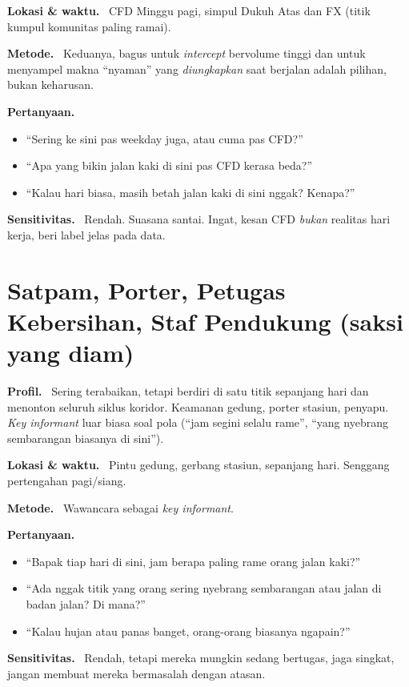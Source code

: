 \documentclass[11pt,a4paper]{report}
\newcommand{\fld}[1]{\smallskip\noindent\textbf{#1.}\ }
\begin{document}
\fld{Lokasi \& waktu} CFD Minggu pagi, simpul Dukuh Atas dan FX (titik kumpul komunitas
paling ramai).

\fld{Metode} Keduanya, bagus untuk \emph{intercept} bervolume tinggi dan untuk menyampel
makna ``nyaman'' yang \emph{diungkapkan} saat berjalan adalah pilihan, bukan keharusan.

\fld{Pertanyaan}
\begin{itemize}
  \item ``Sering ke sini pas weekday juga, atau cuma pas CFD?''
  \item ``Apa yang bikin jalan kaki di sini pas CFD kerasa beda?''
  \item ``Kalau hari biasa, masih betah jalan kaki di sini nggak? Kenapa?''
\end{itemize}

\fld{Sensitivitas} Rendah. Suasana santai. Ingat, kesan CFD \emph{bukan} realitas hari
kerja, beri label jelas pada data.

\section{Satpam, Porter, Petugas Kebersihan, Staf Pendukung \textnormal{(saksi yang diam)}}
\fld{Profil} Sering terabaikan, tetapi berdiri di satu titik sepanjang hari dan menonton
seluruh siklus koridor. Keamanan gedung, porter stasiun, penyapu. \emph{Key informant}
luar biasa soal pola (``jam segini selalu rame'', ``yang nyebrang sembarangan biasanya
di sini'').

\fld{Lokasi \& waktu} Pintu gedung, gerbang stasiun, sepanjang hari. Senggang pertengahan
pagi/siang.

\fld{Metode} Wawancara sebagai \emph{key informant}.

\fld{Pertanyaan}
\begin{itemize}
  \item ``Bapak tiap hari di sini, jam berapa paling rame orang jalan kaki?''
  \item ``Ada nggak titik yang orang sering nyebrang sembarangan atau jalan di badan jalan? Di mana?''
  \item ``Kalau hujan atau panas banget, orang-orang biasanya ngapain?''
\end{itemize}

\fld{Sensitivitas} Rendah, tetapi mereka mungkin sedang bertugas, jaga singkat, jangan
membuat mereka bermasalah dengan atasan.
\end{document}
